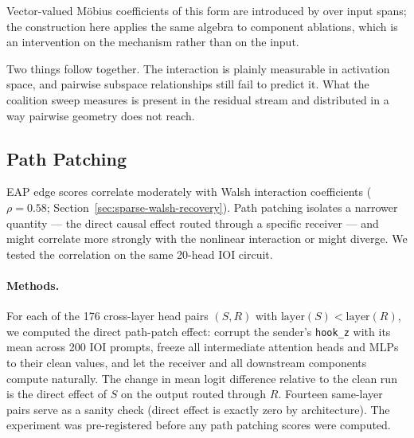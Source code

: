 \documentclass{article}
\begin{document}
Vector-valued M\"obius coefficients of this form are introduced by
\citet{jansma2026compositional} over input spans; the construction
here applies the same algebra to component ablations, which is an intervention on the
mechanism rather than on the input.

Two things follow together. The interaction is plainly measurable in activation
space, and pairwise subspace relationships still fail to predict it. What the coalition
sweep measures is present in the residual stream and distributed in a way pairwise
geometry does not reach.


%
%

\subsection{Path Patching}
\label{sec:path-patching}

EAP edge scores correlate moderately with Walsh interaction coefficients
($\rho = 0.58$; Section~\ref{sec:sparse-walsh-recovery}). Path patching
isolates a narrower quantity --- the direct causal effect routed through a
specific receiver --- and might correlate more strongly with the
nonlinear interaction or might diverge. We tested the correlation on the same
20-head IOI circuit.

\paragraph{Methods.}

For each of the 176 cross-layer head pairs $(S, R)$ with
$\text{layer}(S) < \text{layer}(R)$, we computed the direct path-patch
effect: corrupt the sender's \texttt{hook\_z} with its mean across 200
IOI prompts, freeze all intermediate attention heads and MLPs to their
clean values, and let the receiver and all downstream components compute
naturally. The change in mean logit difference relative to the clean run
is the direct effect of $S$ on the output routed through $R$. Fourteen
same-layer pairs serve as a sanity check (direct effect is exactly zero
by architecture). The experiment was pre-registered before any path
patching scores were computed.
\end{document}

